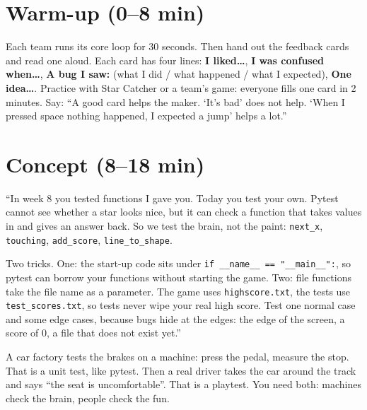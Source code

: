 \section{Warm-up (0--8 min)}
\begin{unplugged}
Each team runs its core loop for 30 seconds. Then hand out the feedback cards and read one aloud.
Each card has four lines: \textbf{I liked…}, \textbf{I was confused when…}, \textbf{A bug I saw:} (what I
did / what happened / what I expected), \textbf{One idea…}. Practice with Star Catcher or a team's
game: everyone fills one card in 2 minutes. Say: \enquote{A good card helps the maker. \enquote{It's bad}
does not help. \enquote{When I pressed space nothing happened, I expected a jump} helps a lot.}
\end{unplugged}

\section{Concept (8--18 min)}
\begin{teacherscript}
“In week 8 you tested functions I gave you. Today you test your own. Pytest cannot see whether a
star looks nice, but it can check a function that takes values in and gives an answer back. So we
test the brain, not the paint: \texttt{next\_x}, \texttt{touching}, \texttt{add\_score}, \texttt{line\_to\_shape}.

Two tricks. One: the start-up code sits under \texttt{if \_\_name\_\_ == "\_\_main\_\_":}, so pytest
can borrow your functions without starting the game. Two: file functions take the file name as a
parameter. The game uses \texttt{highscore.txt}, the tests use \texttt{test\_scores.txt}, so tests never
wipe your real high score. Test one normal case and some edge cases, because bugs hide at the edges:
the edge of the screen, a score of 0, a file that does not exist yet.”
\end{teacherscript}

\begin{analogy}
A car factory tests the brakes on a machine: press the pedal, measure the stop. That is a unit test,
like pytest. Then a real driver takes the car around the track and says \enquote{the seat is
uncomfortable}. That is a playtest. You need both: machines check the brain, people check the fun.
\end{analogy}

